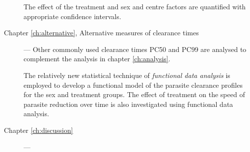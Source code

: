 \begin{description}
The effect of the treatment and sex and centre factors are quantified with appropriate confidence intervals.
\item[Chapter \ref{ch:alternative}, Alternative measures of clearance times] --- Other commonly used clearance times PC50 and PC99 are analysed to complement the analysis in chapter \ref{ch:analysis}.

The relatively new statistical technique of \emph{functional data analysis} is employed to develop a functional model of the parasite clearance profiles for the sex and treatment groups. The effect of treatment on the speed of parasite reduction over time is also investigated using functional data analysis. 
 
\item[Chapter \ref{ch:discussion}] --- 

\end{description}

